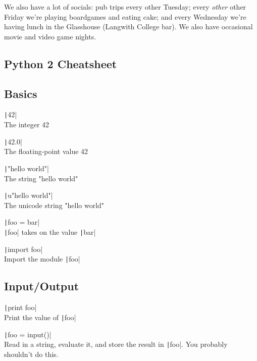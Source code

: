 \documentclass[10pt,a4paper,oneside]{article}
\begin{document}
We also have a lot of socials: pub trips every other Tuesday; every
\textit{other} other Friday we're playing boardgames and eating cake;
and every Wednesday we're having lunch in the Glasshouse (Langwith
College bar). We also have occasional movie and video game nights.

\pagebreak

\begin{landscape}
\begin{multicols}{3}

\section*{Python 2 Cheatsheet}

\renewcommand{\arraystretch}{1.5}

\subsection*{Basics}

\texttt|42|\\
{\small The integer 42}

\texttt|42.0|\\
{\small The floating-point value 42}

\texttt|"hello world"|\\
{\small The string "hello world"}

\texttt|u"hello world"|\\
{\small  The unicode string "hello world"}

\texttt|foo = bar|\\
{\small \texttt|foo| takes on the value
  \texttt|bar|}

\texttt|import foo|\\
{\small Import the module \texttt|foo|}

\vspace{-0.25cm}
\subsection*{Input/Output}

\texttt|print foo|\\
Print the value of \texttt|foo|

\texttt|foo = input()|\\
Read in a string, evaluate it, and store the result in
\texttt|foo|. You probably shouldn't do this.


\end{multicols}
\end{landscape}
\end{document}
